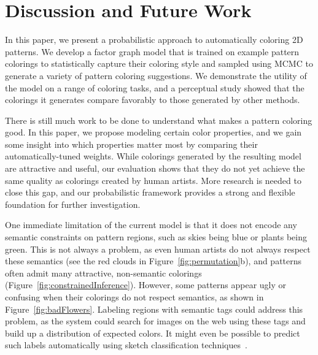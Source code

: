\section{Discussion and Future Work}
\label{sec:discussion}

In this paper, we present a probabilistic approach to automatically coloring 2D patterns. We develop a factor graph model that is trained on example pattern colorings to statistically capture their coloring style and sampled using MCMC to generate a variety of pattern coloring suggestions. We demonstrate the utility of the model on a range of coloring tasks, and a perceptual study showed that the colorings it generates compare favorably to those generated by other methods.

There is still much work to be done to understand what makes a pattern coloring good. In this paper, we propose modeling certain color properties, and we gain some insight into which properties matter most by comparing their automatically-tuned weights. While colorings generated by the resulting model are attractive and useful, our evaluation shows that they do not yet achieve the same quality as colorings created by human artists. More research is needed to close this gap, and our probabilistic framework provides a strong and flexible foundation for further investigation.

One immediate limitation of the current model is that it does not encode any semantic constraints on pattern regions, such as skies being blue or plants being green. This is not always a problem, as even human artists do not always respect these semantics (see the red clouds in Figure~\ref{fig:permutation}b), and patterns often admit many attractive, non-semantic colorings (Figure~\ref{fig:constrainedInference}). However, some patterns appear ugly or confusing when their colorings do not respect semantics, as shown in Figure~\ref{fig:badFlowers}. Labeling regions with semantic tags could address this problem, as the system could search for images on the web using these tags and build up a distribution of expected colors. It might even be possible to predict such labels automatically using sketch classification techniques~\cite{SketchClassification}.

